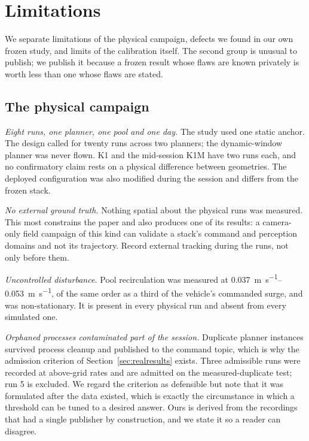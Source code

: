 \section{Limitations}
\label{sec:limitations}

We separate limitations of the physical campaign, defects we found in our
own frozen study, and limits of the calibration itself. The second group
is unusual to publish; we publish it because a frozen result whose flaws
are known privately is worth less than one whose flaws are stated.

\subsection{The physical campaign}

\emph{Eight runs, one planner, one pool and one day.} The study used one
static anchor. The design called for twenty runs across two planners; the
dynamic-window planner was never flown. \textsf{K1} and the mid-session
\textsf{K1M} have two runs each, and no confirmatory claim rests on a
physical difference between geometries. The deployed configuration was
also modified during the session and differs from the frozen stack.

\emph{No external ground truth.} Nothing spatial about the physical runs
was measured. This most constrains the paper and also produces one of its
results: a camera-only field campaign of this kind can validate a stack's
command and perception domains and not its trajectory. Record external
tracking during the runs, not only before them.

\emph{Uncontrolled disturbance.} Pool recirculation was measured at
\SIrange{0.037}{0.053}{\metre\per\second}, of the same order as a third
of the vehicle's commanded surge, and was non-stationary. It is present
in every physical run and absent from every simulated one.

\emph{Orphaned processes contaminated part of the session.} Duplicate
planner instances survived process cleanup and published to the command
topic, which is why the admission criterion of
Section~\ref{sec:realresults} exists. Three admissible runs were recorded
at above-grid rates and are admitted on the measured-duplicate test; run
5 is excluded. We regard the criterion as defensible but note that it was
formulated after the data existed, which is exactly the circumstance in
which a threshold can be tuned to a desired answer. Ours is derived from
the recordings that had a single publisher by construction, and we state
it so a reader can disagree.

